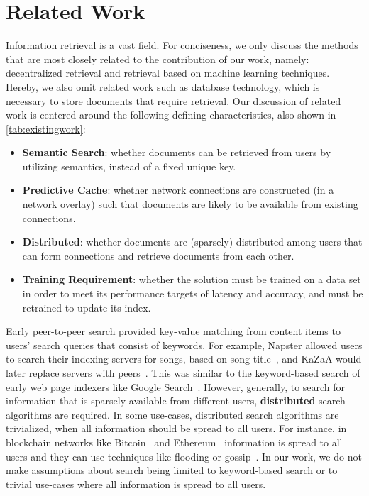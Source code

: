 \section{Related Work}
\label{sec:relatedwork}

Information retrieval is a vast field. For conciseness, we only discuss the methods that are most closely related to the contribution of our work, namely: decentralized retrieval and retrieval based on machine learning techniques.
Hereby, we also omit related work such as database technology, which is necessary to store documents that require retrieval.
Our discussion of related work is centered around the following defining characteristics, also shown in \autoref{tab:existingwork}:

\begin{itemize}
   \item \textbf{Semantic Search}: whether documents can be retrieved from users by utilizing semantics, instead of a fixed unique key.
   \item \textbf{Predictive Cache}: whether network connections are constructed (in a network overlay) such that documents are likely to be available from existing connections.
   \item \textbf{Distributed}: whether documents are (sparsely) distributed among users that can form connections and retrieve documents from each other.
   \item \textbf{Training Requirement}: whether the solution must be trained on a data set in order to meet its performance targets of latency and accuracy, and must be retrained to update its index.
\end{itemize}


Early peer-to-peer search provided key-value matching from content items to users' search queries that consist of keywords.
For example, Napster allowed users to search their indexing servers for songs, based on song title~\cite{carlsson2001rise}, and
KaZaA would later replace servers with peers~\cite{liang2005kazaa}.
This was similar to the keyword-based search of early web page indexers like Google Search~\cite{brin1998anatomy}.
However, generally, to search for information that is sparsely available from different users, \textbf{distributed} search algorithms are required.
In some use-cases, distributed search algorithms are trivialized, when all information should be spread to all users.
For instance, in blockchain networks like Bitcoin~\cite{nakamoto2008bitcoin} and Ethereum~\cite{wood2014ethereum} information is spread to all users and they can use techniques like flooding or gossip~\cite{vansteen2018distributed}. In our work, we do not make assumptions about search being limited to keyword-based search or to trivial use-cases where all information is spread to all users.

